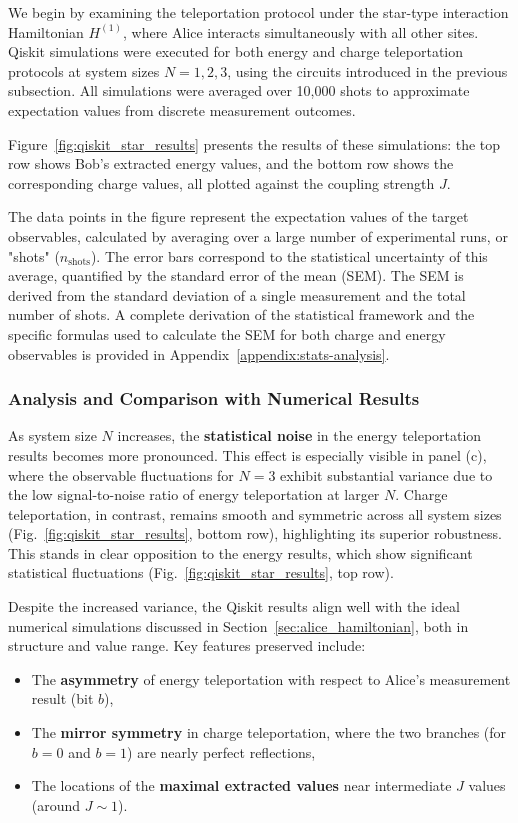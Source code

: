 We begin by examining the teleportation protocol under the star-type interaction Hamiltonian \( H^{(1)} \), where Alice interacts simultaneously with all other sites. Qiskit simulations were executed for both energy and charge teleportation protocols at system sizes \( N = 1, 2, 3 \), using the circuits introduced in the previous subsection. All simulations were averaged over 10{,}000 shots to approximate expectation values from discrete measurement outcomes.

Figure~\ref{fig:qiskit_star_results} presents the results of these simulations: the top row shows Bob’s extracted energy values, and the bottom row shows the corresponding charge values, all plotted against the coupling strength \( J \).

The data points in the figure represent the expectation values of the target observables, calculated by averaging over a large number of experimental runs, or "shots" ($n_{\text{shots}}$). The error bars correspond to the statistical uncertainty of this average, quantified by the standard error of the mean (SEM). The SEM is derived from the standard deviation of a single measurement and the total number of shots. A complete derivation of the statistical framework and the specific formulas used to calculate the SEM for both charge and energy observables is provided in Appendix~\ref{appendix:stats-analysis}.

\subsubsection*{Analysis and Comparison with Numerical Results}

As system size \( N \) increases, the \textbf{statistical noise} in the energy teleportation results becomes more pronounced. This effect is especially visible in panel (c), where the observable fluctuations for \( N = 3 \) exhibit substantial variance due to the low signal-to-noise ratio of energy teleportation at larger \( N \). Charge teleportation, in contrast, remains smooth and symmetric across all system sizes (Fig.~\ref{fig:qiskit_star_results}, bottom row), highlighting its superior robustness. This stands in clear opposition to the energy results, which show significant statistical fluctuations (Fig.~\ref{fig:qiskit_star_results}, top row).

Despite the increased variance, the Qiskit results align well with the ideal numerical simulations discussed in Section~\ref{sec:alice_hamiltonian}, both in structure and value range. Key features preserved include:
\begin{itemize}
    \item The \textbf{asymmetry} of energy teleportation with respect to Alice’s measurement result (bit \( b \)),
    \item The \textbf{mirror symmetry} in charge teleportation, where the two branches (for \( b = 0 \) and \( b = 1 \)) are nearly perfect reflections,
    \item The locations of the \textbf{maximal extracted values} near intermediate \( J \) values (around \( J \sim 1 \)).
\end{itemize}

